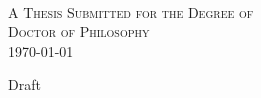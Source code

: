 
\begin{titlingpage}
 \begin{flushright}\leavevmode
    \normalfont
    \vfill

    {\HUGE \textsc{\thesisTitle}\par}%
    \hrulefill\par
    \vspace{0.25cm}
    {\Large \thesisAuthor\\\authorDegree\par}%
    \vspace{2cm}
    
    {\Large \textsc{A Thesis Submitted for the Degree of\\Doctor of Philosophy\\[0.5em]}}
    \yearonly\today\\[1em]

    \vfill
    {\Large Draft \par}%
    \vfill

  \end{flushright}%
\end{titlingpage}
